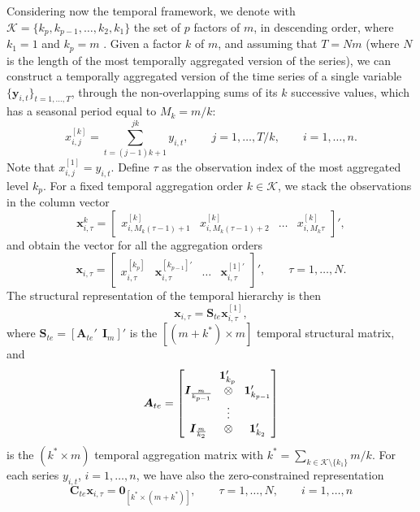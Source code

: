 \documentclass[a4paper,11pt]{article}
\newcommand{\Unovet}{\bm{1}}
\newcommand{\xvet}{\bm{x}}
\newcommand{\yvet}{\bm{y}}
\newcommand{\Avet}{\bm{A}}
\newcommand{\Cvet}{\bm{C}}
\newcommand{\Ivet}{\bm{I}}
\newcommand{\Svet}{\bm{S}}
\newcommand{\Zerovet}{\bm{0}}
\theoremstyle{definition}
\begin{document}
Considering now the temporal framework, we denote with $\mathcal{K} = \{ k_p , k_{p-1}, \dots, k_2, k_1 \}$ the set of $p$ factors of $m$, in descending order, where $k_1= 1$ and $k_p= m$ \citep{athanasopoulos2017}. Given a factor $k$ of $m$, and assuming that $T = N m$ (where $N$ is the length of the most temporally aggregated version of the series), we can construct a temporally aggregated version of the time series of a single variable $\{\yvet_{i,t}\}_{t = 1, \dots, T}$, through the non-overlapping sums of its $k$ successive values, which has a seasonal period equal to $M_k= m/k$:
$$
	x_{i,j}^{[k]} = \sum_{t=(j-1)k+1}^{jk} y_{i,t},\qquad j = 1,\dots, T/k, \qquad i = 1,\dots,n.
$$
Note that $x_{i,j}^{[1]}=y_{i,t}$. Define $\tau$ as the observation index of the most aggregated level $k_p$. For a fixed temporal aggregation order $k \in \mathcal{K}$, we stack the observations in the column vector
$$
	\xvet_{i,\tau}^{k} = \begin{bmatrix}x_{i,M_k(\tau-1)+1}^{[k]} & x_{i,M_k(\tau-1)+2}^{[k]} & \dots & x_{i,M_k\tau}^{[k]}\end{bmatrix}',
$$
and obtain the vector for all the aggregation orders
$$
	\xvet_{i,\tau} = \begin{bmatrix}
		x_{i,\tau}^{[k_p]}               &
		\xvet_{i,\tau}^{[k_{p-1}]\prime} &
		\dots                            &
		\xvet_{i,\tau}^{[1]\prime}
	\end{bmatrix}',\qquad \tau = 1,\dots,N.
$$
The structural representation of the temporal hierarchy \citep{athanasopoulos2017} is then
$$
	\xvet_{i,\tau} = \Svet_{te}\xvet_{i,\tau}^{[1]},
$$
where $\Svet_{te} = [\Avet_{te}' ~~ \Ivet_{m}]'$ is the $[(m+k^\ast) \times m]$ temporal structural matrix, and
$$
	\Avet_{te} = \begin{bmatrix}
		\multicolumn{3}{c}{\Unovet_{k_p}'}                       \\
		\Ivet_{\frac{m}{k_{p-1}}} & \otimes & \Unovet_{k_{p-1}}' \\
		                          & \vdots  &                    \\
		\Ivet_{\frac{m}{k_{2}}}   & \otimes & \Unovet_{k_2}'
	\end{bmatrix}
$$
is the $(k^\ast \times m)$ temporal aggregation matrix with $k^\ast = \sum_{k \in \mathcal{K}\setminus\{k_1\}} m/k$. For each series $y_{i,t}$, $i = 1,\dots,n$, we have also the zero-constrained representation
\begin{equation}
	\label{eq:te_con}
	\Cvet_{te}\xvet_{i,\tau} = \Zerovet_{[k^\ast \times (m+k^\ast)]}, \qquad \tau = 1,\dots,N, \qquad i = 1,\dots, n
\end{equation}
\end{document}
